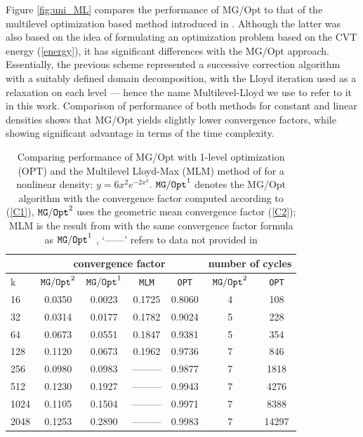 \documentclass{siamltex}
\begin{document}
Figure \ref{fig:uni_ML}  compares the performance of MG/Opt to that of the multilevel optimization based method introduced in \cite{DE08}. Although the latter was also based on the idea of formulating an optimization problem based on the CVT energy (\ref{energy}), it has significant differences with the MG/Opt approach. Essentially, the previous scheme represented a successive correction algorithm with a suitably defined domain decomposition, with the Lloyd iteration used as a relaxation on each level --- hence %
the name Multilevel-Lloyd we use to refer to it in this work. Comparison of performance of both methods for constant and linear densities shows that MG/Opt yields slightly lower convergence factors, while showing significant advantage in terms of the time complexity.




\begin{table}
\begin{center}
\begin{tabular}{| l |c | c | c | c | c |c |} \hline
 &\multicolumn{4}{|c|}{convergence factor} &\multicolumn{2}{|c|}{number of cycles }\\ \hline
k& ${\tt MG/Opt}^{2}$&${\tt MG/Opt}^{1}$&{\tt MLM}\cite{yavneh03}&{\tt OPT}&${\tt MG/Opt}^{2}$&{\tt OPT}\\ \hline
16&0.0350&0.0023&0.1725&0.8060&4&108\\ \hline
32&0.0314&0.0177&0.1782&0.9024&5&228 \\ \hline
64&0.0673&0.0551&0.1847&0.9381&5&354 \\ \hline
128&0.1120&0.0673&0.1962&0.9736&7&846 \\ \hline
256&0.0980& 0.0983 &    ---------    &0.9877&7&1818\\ \hline
512&0.1230&  0.1927         &---------   &0.9943&7&4276 \\ \hline
1024&0.1105&0.1504          & --------- &0.9971&7&8388\\ \hline
2048&0.1253&   0.2890          & ---------   &0.9983&7&14297 \\ \hline
 \end{tabular}
\end{center}
\caption{Comparing performance of MG/Opt with 1-level optimization (OPT) and the Multilevel Lloyd-Max %
(MLM) method of \cite{yavneh03} for a nonlinear density: $y=6x^{2}e^{-2x^{3}}$. %
${\tt MG/Opt}^{1}$ denotes the MG/Opt algorithm with the convergence factor computed according to %
(\ref{C1}), ${\tt MG/Opt}^{2}$ uses the geometric mean convergence factor (\ref{C2}); MLM\cite{yavneh03} is the result from \cite{yavneh03} with the same convergence factor formula as ${\tt MG/Opt}^{1}$ , 
`------' refers to data not provided in \cite{yavneh03}} %
\label{mytable}
\end{table}
\end{document}
